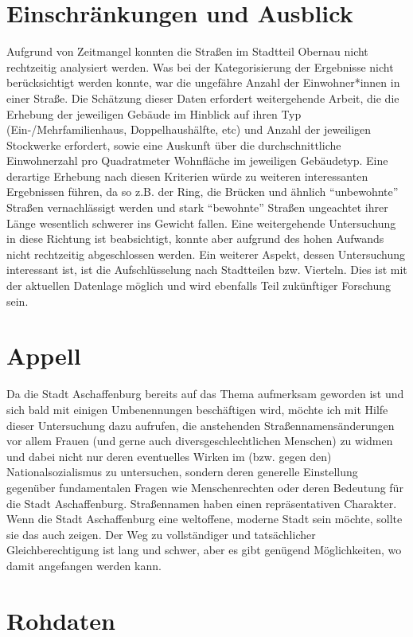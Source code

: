 \documentclass[ngerman,twocolumn,showpacs,%
  nofootinbib,aps,superscriptaddress,%
  eqsecnum,prd,notitlepage,showkeys,10pt,report]{revtex4-2}
\begin{document}
\section{Einschränkungen und Ausblick}
Aufgrund von Zeitmangel konnten die Straßen im Stadtteil Obernau nicht rechtzeitig
analysiert werden. Was bei der Kategorisierung der Ergebnisse nicht berücksichtigt werden
konnte, war die ungefähre Anzahl der Einwohner*innen in einer Straße. Die Schätzung
dieser Daten erfordert weitergehende Arbeit, die die Erhebung der jeweiligen Gebäude im
Hinblick auf ihren Typ (Ein-/Mehrfamilienhaus, Doppelhaushälfte, etc) und Anzahl der
jeweiligen Stockwerke erfordert, sowie eine Auskunft über die durchschnittliche
Einwohnerzahl pro Quadratmeter Wohnfläche im jeweiligen Gebäudetyp. Eine derartige
Erhebung nach diesen Kriterien würde zu weiteren interessanten Ergebnissen führen, da so
z.B. der Ring, die Brücken und ähnlich “unbewohnte” Straßen vernachlässigt werden und
stark “bewohnte” Straßen ungeachtet ihrer Länge wesentlich schwerer ins Gewicht fallen.
Eine weitergehende Untersuchung in diese Richtung ist beabsichtigt, konnte aber aufgrund
des hohen Aufwands nicht rechtzeitig abgeschlossen werden.
Ein weiterer Aspekt, dessen Untersuchung interessant ist, ist die Aufschlüsselung nach
Stadtteilen bzw. Vierteln. Dies ist mit der aktuellen Datenlage möglich und wird ebenfalls Teil
zukünftiger Forschung sein.

\section{Appell}
Da die Stadt Aschaffenburg bereits auf das Thema aufmerksam geworden ist und sich bald
mit einigen Umbenennungen beschäftigen wird, möchte ich mit Hilfe dieser Untersuchung
dazu aufrufen, die anstehenden Straßennamensänderungen vor allem Frauen (und gerne
auch diversgeschlechtlichen Menschen) zu widmen und dabei nicht nur deren eventuelles
Wirken im (bzw. gegen den) Nationalsozialismus zu untersuchen, sondern deren generelle
Einstellung gegenüber fundamentalen Fragen wie Menschenrechten oder deren Bedeutung
für die Stadt Aschaffenburg.
Straßennamen haben einen repräsentativen Charakter. Wenn die Stadt Aschaffenburg eine
weltoffene, moderne Stadt sein möchte, sollte sie das auch zeigen. Der Weg zu vollständiger
und tatsächlicher Gleichberechtigung ist lang und schwer, aber es gibt genügend
Möglichkeiten, wo damit angefangen werden kann.


\appendix
\section{Rohdaten}
\end{document}
